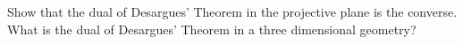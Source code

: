 Show that the dual of Desargues' Theorem in the projective plane is the converse. What is the dual of Desargues' Theorem in a three dimensional geometry?
